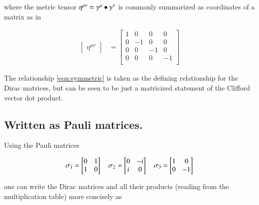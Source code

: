 where the metric tensor $\eta^{\mu\nu} = {\gamma^\mu} \bullet {\gamma^\nu}$ is commonly summarized as coordinates of a matrix as in

\begin{align*}
\begin{bmatrix}
\eta^{\mu\nu}
\end{bmatrix}
&=
\begin{bmatrix}
1 & 0 & 0 & 0 \\
0 & -1 & 0 & 0 \\
0 & 0 & -1 & 0 \\
0 & 0 & 0 & -1 \\
\end{bmatrix}
\end{align*}

The relationship \ref{eqn:symmetric} is taken as the defining relationship for the Dirac matrices, but can be seen to be just a matricized statement of the Clifford vector dot product.

\subsection{Written as Pauli matrices. }

Using the Pauli matrices

\begin{align}
\sigma_1 = \begin{bmatrix} 0 & 1 \\ 1 & 0 \\ \end{bmatrix} \quad \sigma_2 = \begin{bmatrix} 0 & -i \\ i & 0 \\ \end{bmatrix} \quad \sigma_3 = \begin{bmatrix} 1 & 0 \\ 0 & -1 \\ \end{bmatrix}
\end{align}

one can write the Dirac matrices and all their products (reading from the multiplication table) more concisely as

